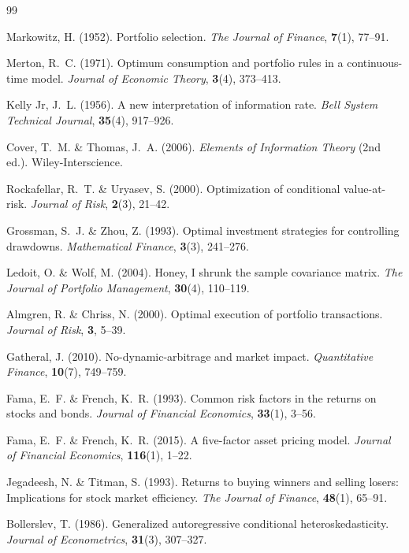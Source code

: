 \documentclass[10pt,leqno]{amsart}
\begin{document}
\begin{thebibliography}{99}

 Markowitz, H. (1952). Portfolio selection. \textit{The Journal of Finance}, \textbf{7}(1), 77--91.

 Merton, R.~C. (1971). Optimum consumption and portfolio rules in a continuous-time model. \textit{Journal of Economic Theory}, \textbf{3}(4), 373--413.

 Kelly Jr, J.~L. (1956). A new interpretation of information rate. \textit{Bell System Technical Journal}, \textbf{35}(4), 917--926.

 Cover, T.~M. \& Thomas, J.~A. (2006). \textit{Elements of Information Theory} (2nd ed.). Wiley-Interscience.

 Rockafellar, R.~T. \& Uryasev, S. (2000). Optimization of conditional value-at-risk. \textit{Journal of Risk}, \textbf{2}(3), 21--42.

 Grossman, S.~J. \& Zhou, Z. (1993). Optimal investment strategies for controlling drawdowns. \textit{Mathematical Finance}, \textbf{3}(3), 241--276.

 Ledoit, O. \& Wolf, M. (2004). Honey, I shrunk the sample covariance matrix. \textit{The Journal of Portfolio Management}, \textbf{30}(4), 110--119.

 Almgren, R. \& Chriss, N. (2000). Optimal execution of portfolio transactions. \textit{Journal of Risk}, \textbf{3}, 5--39.

 Gatheral, J. (2010). No-dynamic-arbitrage and market impact. \textit{Quantitative Finance}, \textbf{10}(7), 749--759.

 Fama, E.~F. \& French, K.~R. (1993). Common risk factors in the returns on stocks and bonds. \textit{Journal of Financial Economics}, \textbf{33}(1), 3--56.

 Fama, E.~F. \& French, K.~R. (2015). A five-factor asset pricing model. \textit{Journal of Financial Economics}, \textbf{116}(1), 1--22.

 Jegadeesh, N. \& Titman, S. (1993). Returns to buying winners and selling losers: Implications for stock market efficiency. \textit{The Journal of Finance}, \textbf{48}(1), 65--91.

 Bollerslev, T. (1986). Generalized autoregressive conditional heteroskedasticity. \textit{Journal of Econometrics}, \textbf{31}(3), 307--327.


\end{thebibliography}
\end{document}
